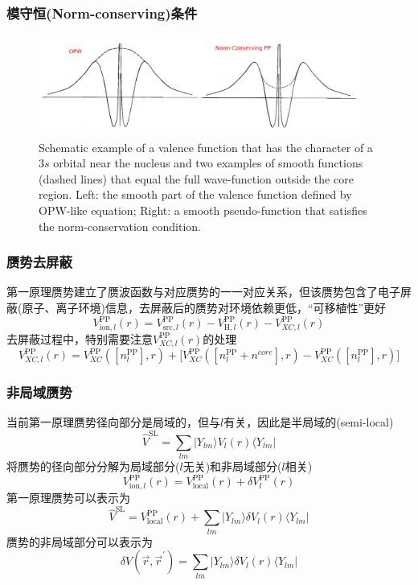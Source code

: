 {\frame
{
	\frametitle{模守恒\textrm{(Norm-conserving)}条件}
\begin{figure}[h!]
\centering
\vspace*{-0.10in}
\includegraphics[height=1.30in,width=4.17in,viewport=0 0 1150 350,clip]{Figures/Pseudo-OPW_NCPP.png}
\caption{\tiny \textrm{Schematic example of a valence function that has the character of a $3s$ orbital near the nucleus and two examples of smooth functions (dashed lines) that equal the full wave-function outside the core region. Left: the smooth part of the valence function defined by OPW-like equation; Right: a smooth pseudo-function that satisfies the norm-conservation condition.}}%
\label{Pseudo-OPW_NCPP}
\end{figure}
}

\frame
{
	\frametitle{赝势去屏蔽}
	第一原理赝势建立了赝波函数与对应赝势的一一对应关系，但该赝势包含了电子屏蔽(原子、离子环境)信息，去屏蔽后的赝势对环境依赖更低，“可移植性”更好
	$$V_{\mathrm{ion},l}^{\mathrm{PP}}(r)=V_{\mathrm{src},l}^{\mathrm{PP}}(r)-V_{\mathrm{H},l}^{\mathrm{PP}}(r)-V_{XC,l}^{\mathrm{PP}}(r)$$
	去屏蔽过程中，特别需要注意$V_{XC,l}^{\mathrm{PP}}(r)$的处理
	$$V_{XC,l}^{\mathrm{PP}}(r)=V_{XC}^{\mathrm{PP}}([n_l^{\mathrm{PP}}],r)+\big[V_{XC}^{\mathrm{PP}}([n_l^{\mathrm{PP}}+n^{core}],r)-V_{XC}^{\mathrm{PP}}([n_l^{\mathrm{PP}}],r)\big]$$
}

\frame
{
	\frametitle{非局域赝势}
	当前第一原理赝势径向部分是局域的，但与$l$有关，因此是半局域的(\textrm{semi-local})
	\begin{displaymath}
		\hat{V}^{\mathrm{SL}}=\sum_{lm}|Y_{lm}\rangle V_l(r)\langle Y_{lm}|
	\end{displaymath}
	将赝势的径向部分分解为局域部分($l$无关)和非局域部分($l$相关)
	\begin{displaymath}
		V_{\mathrm{ion},l}^{\mathrm{PP}}(r)=V_{\mathrm{local}}^{\mathrm{PP}}(r)+\delta V_l^{\mathrm{PP}}(r)
	\end{displaymath}
	第一原理赝势可以表示为
	\begin{displaymath}
		\hat{V}^{\mathrm{SL}}=V_{\mathrm{local}}^{\mathrm{PP}}(r)+\sum_{lm}|Y_{lm}\rangle\delta V_l(r)\langle Y_{lm}|
	\end{displaymath}
	赝势的非局域部分可以表示为
	\begin{displaymath}
		\delta V(\vec r,\vec r^{\prime})=\sum_{lm}|Y_{lm}\rangle\delta V_l(r)\langle Y_{lm}|
	\end{displaymath}
}

}
